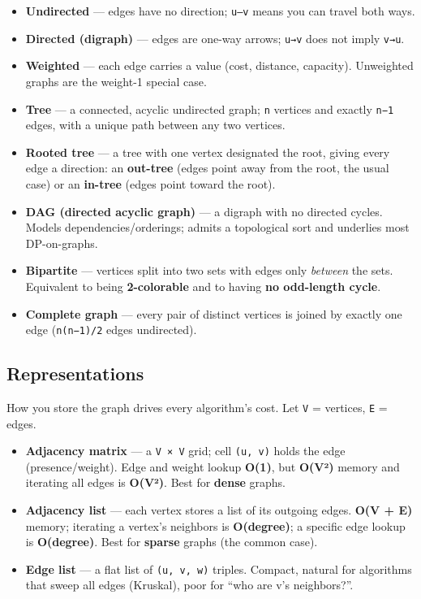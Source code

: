 \documentclass[
  10pt,
  letterpaper,
  onecolumn]{article}
\providecommand{\tightlist}{%
  \setlength{\itemsep}{0pt}\setlength{\parskip}{0pt}}
\begin{document}
\begin{itemize}
\tightlist
\item
  \textbf{Undirected} --- edges have no direction; \texttt{u—v} means
  you can travel both ways.
\item
  \textbf{Directed (digraph)} --- edges are one-way arrows; \texttt{u→v}
  does not imply \texttt{v→u}.
\item
  \textbf{Weighted} --- each edge carries a value (cost, distance,
  capacity). Unweighted graphs are the weight-1 special case.
\item
  \textbf{Tree} --- a connected, acyclic undirected graph; \texttt{n}
  vertices and exactly \texttt{n−1} edges, with a unique path between
  any two vertices.
\item
  \textbf{Rooted tree} --- a tree with one vertex designated the root,
  giving every edge a direction: an \textbf{out-tree} (edges point away
  from the root, the usual case) or an \textbf{in-tree} (edges point
  toward the root).
\item
  \textbf{DAG (directed acyclic graph)} --- a digraph with no directed
  cycles. Models dependencies/orderings; admits a topological sort and
  underlies most DP-on-graphs.
\item
  \textbf{Bipartite} --- vertices split into two sets with edges only
  \emph{between} the sets. Equivalent to being \textbf{2-colorable} and
  to having \textbf{no odd-length cycle}.
\item
  \textbf{Complete graph} --- every pair of distinct vertices is joined
  by exactly one edge (\texttt{n(n−1)/2} edges undirected).
\end{itemize}

\hypertarget{representations}{%
\subsection{Representations}\label{representations}}

How you store the graph drives every algorithm's cost. Let \texttt{V} =
vertices, \texttt{E} = edges.

\begin{itemize}
\tightlist
\item
  \textbf{Adjacency matrix} --- a \texttt{V\ ×\ V} grid; cell
  \texttt{(u,\ v)} holds the edge (presence/weight). Edge and weight
  lookup \textbf{O(1)}, but \textbf{O(V²)} memory and iterating all
  edges is \textbf{O(V²)}. Best for \textbf{dense} graphs.
\item
  \textbf{Adjacency list} --- each vertex stores a list of its outgoing
  edges. \textbf{O(V + E)} memory; iterating a vertex's neighbors is
  \textbf{O(degree)}; a specific edge lookup is \textbf{O(degree)}. Best
  for \textbf{sparse} graphs (the common case).
\item
  \textbf{Edge list} --- a flat list of \texttt{(u,\ v,\ w)} triples.
  Compact, natural for algorithms that sweep all edges (Kruskal), poor
  for ``who are v's neighbors?''.
\end{itemize}
\end{document}
